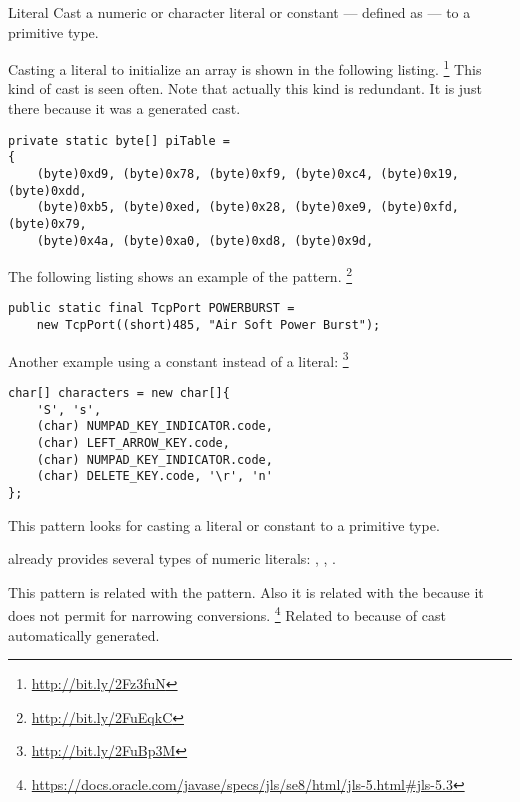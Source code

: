 \begin{pattern}{Literal}
Cast a numeric or character literal or constant --- defined as  ---
to a primitive type.

\instances{}
Casting a literal to initialize an array is shown in the following listing.%
\footnote{\url{http://bit.ly/2Fz3fuN}}
This kind of cast is seen often.
Note that actually this kind is redundant.
It is just there because it was a generated cast.

\begin{verbatim}
private static byte[] piTable =
{
    (byte)0xd9, (byte)0x78, (byte)0xf9, (byte)0xc4, (byte)0x19, (byte)0xdd,
    (byte)0xb5, (byte)0xed, (byte)0x28, (byte)0xe9, (byte)0xfd, (byte)0x79,
    (byte)0x4a, (byte)0xa0, (byte)0xd8, (byte)0x9d, 
\end{verbatim}

The following listing shows an example of the  pattern.%
\footnote{\url{http://bit.ly/2FuEqkC}}
\begin{verbatim}
public static final TcpPort POWERBURST =
    new TcpPort((short)485, "Air Soft Power Burst");
\end{verbatim}

Another example using a constant instead of a literal:%
\footnote{\url{http://bit.ly/2FuBp3M}}

\begin{verbatim}
char[] characters = new char[]{
    'S', 's',
    (char) NUMPAD_KEY_INDICATOR.code,
    (char) LEFT_ARROW_KEY.code,
    (char) NUMPAD_KEY_INDICATOR.code,
    (char) DELETE_KEY.code, '\r', 'n'
};
\end{verbatim}

\detection{}
This pattern looks for casting a literal or constant to a primitive type.

\discussion{}
\java{} already provides several types of numeric literals:
, , .

This pattern is related with the  pattern.
Also it is related with the 
because it does not permit for narrowing conversions.%
\footnote{\url{https://docs.oracle.com/javase/specs/jls/se8/html/jls-5.html\#jls-5.3}}
Related to  because of cast automatically generated.
\end{pattern}